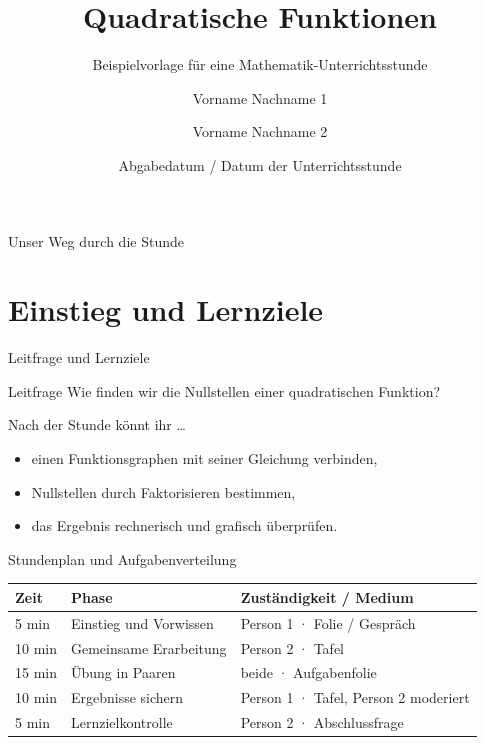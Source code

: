 \documentclass[aspectratio=169,11pt]{beamer}
\title[Quadratische Funktionen]{Quadratische Funktionen}
\subtitle{Beispielvorlage für eine Mathematik-Unterrichtsstunde}
\author[Name 1 \& Name 2]{Vorname Nachname 1 \and Vorname Nachname 2}
\institute[JLU Gießen]{Justus-Liebig-Universität Gießen\\Mathematik · Kurs M12}
\date[Datum]{Abgabedatum / Datum der Unterrichtsstunde}
\begin{document}
\begin{frame}
  \titlepage
\end{frame}

\begin{frame}{Unser Weg durch die Stunde}
  \tableofcontents
\end{frame}

\section[Einstieg]{Einstieg und Lernziele}
\begin{frame}{Leitfrage und Lernziele}
  \begin{block}{Leitfrage}
    Wie finden wir die Nullstellen einer quadratischen Funktion?
  \end{block}
  Nach der Stunde könnt ihr \ldots
  \begin{itemize}
    \item einen Funktionsgraphen mit seiner Gleichung verbinden,
    \item Nullstellen durch Faktorisieren bestimmen,
    \item das Ergebnis rechnerisch und grafisch überprüfen.
  \end{itemize}
\end{frame}

\begin{frame}{Stundenplan und Aufgabenverteilung}
  \small
  \begin{tabular}{@{}p{1.4cm}p{4.2cm}p{5.3cm}@{}}
    \toprule
    Zeit & Phase & Zuständigkeit / Medium \\
    \midrule
    5 min & Einstieg und Vorwissen & Person 1 · Folie / Gespräch \\
    10 min & Gemeinsame Erarbeitung & Person 2 · Tafel \\
    15 min & Übung in Paaren & beide · Aufgabenfolie \\
    10 min & Ergebnisse sichern & Person 1 · Tafel, Person 2 moderiert \\
    5 min & Lernzielkontrolle & Person 2 · Abschlussfrage \\
    \bottomrule
  \end{tabular}
\end{frame}
\end{document}
